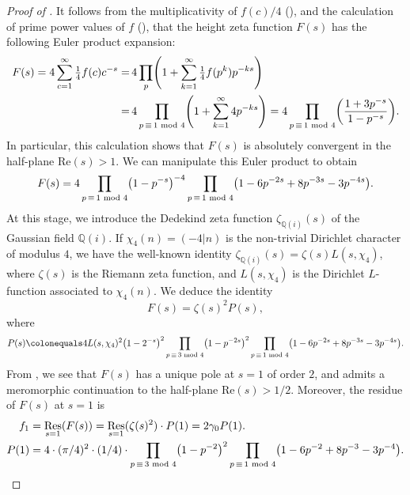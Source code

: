 \documentclass[12pt]{amsart}
\numberwithin{equation}{section} %
\theoremstyle{definition} \newtheorem{definition}[counter]{Definition}
\theoremstyle{remark} \newtheorem{nonexam}[counter]{Non-example}
\newcommand{\QQ}{\mathbb{Q}} %
\newcommand{\md}{\text{ mod }} %
\newcommand{\paren}[1]{\left( #1 \right)} %
\renewcommand{\Re}{\mathrm{Re}} %
\let\originalleft\left \let\originalright\right
\renewcommand{\left}{\mathopen{}\mathclose\bgroup\originalleft}
\renewcommand{\right}{\aftergroup\egroup\originalright}
\DeclareMathOperator{\Res}{Res} %
\begin{document}
\begin{proof}[Proof of {}]
    It follows from the multiplicativity of $f(c)/4$
    (), and the calculation of prime power
    values of $f$ (), that the
    height zeta function $F(s)$ has the following Euler product expansion:
    \begin{align*}
      F(s) = 4\sum_{c=1}^\infty \tfrac14 f(c)c^{-s} =
      & \, 4\prod_{p}\paren{1 + \sum_{k=1}^\infty \tfrac14 f(p^k)p^{-ks} } \\
    = & \, 4\prod_{p \, \equiv\, 1 \md 4}\paren{1 + \sum_{k=1}^\infty 4p^{-ks}}
        = 4\prod_{p \, \equiv\, 1 \md 4}\paren{\dfrac{1+3p^{-s}}{1-p^{-s}}}.
    \end{align*}
    In particular, this calculation shows that $F(s)$ is absolutely convergent
    in the half-plane $\Re(s) > 1$. We can manipulate this Euler product to obtain
    \begin{equation*}
      F(s) = 4 \prod_{p \, \equiv\, 1 \md 4} \paren{1-p^{-s}}^{-4}
      \prod_{p \, \equiv\, 1 \md 4}\paren{1 -6p^{-2s}+8p^{-3s}-3p^{-4s}}.
    \end{equation*}
    At this stage, we introduce the Dedekind zeta function $\zeta_{\QQ(i)}(s)$
    of the Gaussian field $\QQ(i)$. If $\chi_4(n) = (-4 | n)$ is the
    non-trivial Dirichlet character of modulus $4$, we have the well-known
    identity $\zeta_{\QQ(i)}(s) = \zeta(s)L(s,\chi_4)$, where $\zeta(s)$ is
    the Riemann zeta function, and $L(s,\chi_4)$ is the Dirichlet $L$-function
    associated to $\chi_4(n)$.  We deduce the identity
    \begin{equation}
        \label{eq:F=xi.P}
        F(s) = \zeta(s)^2P(s),
    \end{equation}
    where
    \begin{equation*}
      P(s) \colonequals 4L(s,\chi_4)^2\paren{1-2^{-s}}^2
      \prod_{p \, \equiv\, 3 \md 4}\paren{1-p^{-2s}}^2
      \prod_{p \, \equiv\, 1 \md 4}\paren{1 -6p^{-2s}+8p^{-3s}-3p^{-4s}}.
    \end{equation*}
    From , we see that $F(s)$ has a unique pole at $s = 1$
    of order $2$, and admits a meromorphic continuation to the half-plane
    $\Re(s) > 1/2$. Moreover, the residue of $F(s)$ at $s=1$ is
    \begin{align*}
      f_1 &= \Res_{s=1}(F(s)) = \Res_{s=1}(\zeta(s)^2)\cdot P(1) = 2\gamma_0P(1). \\
      P(1) &= 4\cdot(\pi/4)^2\cdot(1/4)\cdot \prod_{p \, \equiv\, 3 \md 4}\paren{1-p^{-2}}^2
      \prod_{p \, \equiv\, 1 \md 4}\paren{1 -6p^{-2}+8p^{-3}-3p^{-4}}.
    \end{align*}



\end{proof}
\end{document}
